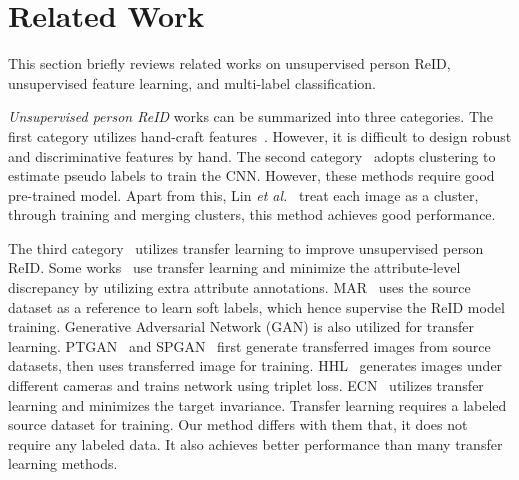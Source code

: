 \documentclass[10pt,twocolumn,letterpaper]{article}
\begin{document}
\section{Related Work} \label{sec:relatedwork}
This section briefly reviews related works on unsupervised person ReID, unsupervised feature learning, and multi-label classification.

\emph{Unsupervised person ReID} works can be summarized into three categories. The first category utilizes hand-craft features~\cite{liao2015person,zheng2015scalable}. However, it is difficult to design robust and discriminative features by hand. The second category~\cite{fan2018unsupervised,Fu_2019_ICCV} adopts clustering to estimate pseudo labels to train the CNN. However, these methods require good pre-trained model. Apart from this, Lin \emph{et al.}~\cite{lin2019bottom} treat each image as a cluster, through training and merging clusters, this method achieves good performance.

The third category~\cite{lin2018multi,wang2018transferable,yu2019unsupervised,wei2018person,deng2018image,zhong2018generalizing,zhong2019invariance,
Chen_2019_ICCV,Wu_2019_ICCV,Li_2019_ICCV,Qi_2019_ICCV,Zhang_2019_ICCV} utilizes transfer learning to improve unsupervised person ReID. Some works~\cite{lin2018multi,wang2018transferable} use transfer learning and minimize the attribute-level discrepancy by utilizing extra attribute annotations. MAR~\cite{yu2019unsupervised} uses the source dataset as a reference to learn soft labels, which hence supervise the ReID model training. Generative Adversarial Network (GAN) is also utilized for transfer learning. PTGAN~\cite{wei2018person} and SPGAN~\cite{deng2018image} first generate transferred images from source datasets, then uses transferred image for training. HHL~\cite{zhong2018generalizing} generates images under different cameras and trains network using triplet loss. ECN~\cite{zhong2019invariance} utilizes transfer learning and minimizes the target invariance. Transfer learning requires a labeled source dataset for training. Our method differs with them that, it does not require any labeled data. It also achieves better performance than many transfer learning methods.
\end{document}

